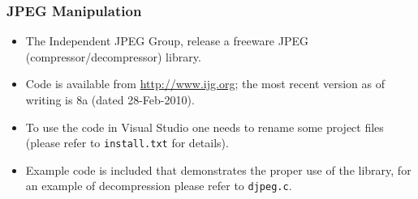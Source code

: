 \documentclass[table]{beamer}
\let\oldurl=\url
\renewcommand{\url}[1]{\textcolor{blue}{\oldurl{#1}}}
\begin{document}
\begin{frame}
\frametitle{JPEG Manipulation}
\begin{itemize}
\item The Independent JPEG Group, release a freeware JPEG (compressor/decompressor) library.
\item Code is available from \url{http://www.ijg.org}; the most recent version as of writing is 8a (dated 28-Feb-2010).
\item To use the code in Visual Studio one needs to rename some project files (please refer to {\tt install.txt} for details).
\item Example code is included that demonstrates the proper use of the library, for an example of decompression please refer to {\tt djpeg.c}.
\end{itemize}


\end{frame}
\end{document}

